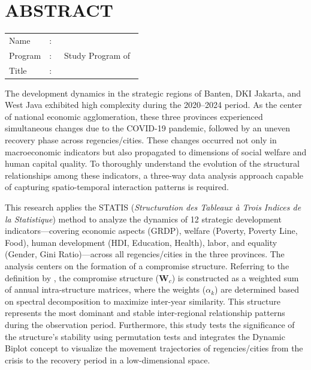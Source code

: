 %
%
%

\chapter*{\normalsize ABSTRACT}
\begin{singlespace}
\vspace*{0.2cm}

\noindent \begin{tabular}{l l >{\raggedright\arraybackslash}p{11.0cm}}
	Name&: & \penulis \\ %
	Program&: & \jenjanginggris~Study Program of~\bidanginggris \\ %
	Title&: & \judulInggris \\ %
\end{tabular}

\vspace*{0.5cm}

\noindent

The development dynamics in the strategic regions of Banten, DKI Jakarta, and West Java exhibited high complexity during the 2020--2024 period. As the center of national economic agglomeration, these three provinces experienced simultaneous changes due to the COVID-19 pandemic, followed by an uneven recovery phase across regencies/cities. These changes occurred not only in macroeconomic indicators but also propagated to dimensions of social welfare and human capital quality. To thoroughly understand the evolution of the structural relationships among these indicators, a three-way data analysis approach capable of capturing spatio-temporal interaction patterns is required.

This research applies the STATIS (\textit{Structuration des Tableaux à Trois Indices de la Statistique}) method to analyze the dynamics of 12 strategic development indicators---covering economic aspects (GRDP), welfare (Poverty, Poverty Line, Food), human development (HDI, Education, Health), labor, and equality (Gender, Gini Ratio)---across all regencies/cities in the three provinces. The analysis centers on the formation of a compromise structure. Referring to the definition by \citet{lavit94}, the compromise structure ($\mathbf{W}_c$) is constructed as a weighted sum of annual intra-structure matrices, where the weights ($\alpha_k$) are determined based on spectral decomposition to maximize inter-year similarity. This structure represents the most dominant and stable inter-regional relationship patterns during the observation period. Furthermore, this study tests the significance of the structure's stability using permutation tests and integrates the Dynamic Biplot concept to visualize the movement trajectories of regencies/cities from the crisis to the recovery period in a low-dimensional space.


\end{singlespace}
